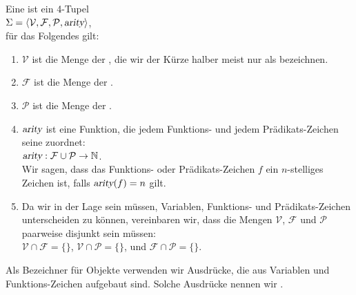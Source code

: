 \begin{Definition}[Signatur]
  Eine  ist ein 4-Tupel \\[0.2cm]
  \hspace*{1.3cm} $\Sigma = \langle \mathcal{V}, \mathcal{F}, \mathcal{P}, \textsl{arity} \rangle$, \\[0.2cm]
  für das Folgendes gilt: 
  \begin{enumerate}
  \item $\mathcal{V}$ ist die Menge der , die wir der Kürze halber meist nur als
         be\-zeichnen.
  \item $\mathcal{F}$ ist die Menge der .
  \item $\mathcal{P}$ ist die Menge der .
  \item $\textsl{arity}$ ist eine Funktion, die jedem Funktions- und jedem Prädikats-Zeichen seine
         zuordnet: \\[0.2cm]
        \hspace*{1.3cm} $\textsl{arity}: \mathcal{F} \cup \mathcal{P} \rightarrow \mathbb{N}$. \\[0.2cm]
        Wir sagen, dass das Funktions- oder Prädikats-Zeichen $f$ ein
        $n$-stelliges Zeichen ist, falls $\textsl{arity}(f) = n$ gilt.
  \item Da wir in der Lage sein müssen, Variablen, Funktions- und Prädikats-Zeichen
        unterscheiden zu können, vereinbaren wir, dass die Mengen $\mathcal{V}$,
        $\mathcal{F}$ und $\mathcal{P}$ paarweise disjunkt sein müssen: \\[0.2cm] 
        \hspace*{1.3cm} $\mathcal{V} \cap \mathcal{F} = \{\}$, \quad
                        $\mathcal{V} \cap \mathcal{P} = \{\}$, \quad und \quad
                        $\mathcal{F} \cap \mathcal{P} = \{\}$. \eox
  \end{enumerate}
\end{Definition}

\noindent
Als Bezeichner für Objekte verwenden wir Ausdrücke, die aus Variablen und
Funktions-Zeichen aufgebaut sind.  Solche Ausdrücke nennen wir .  

